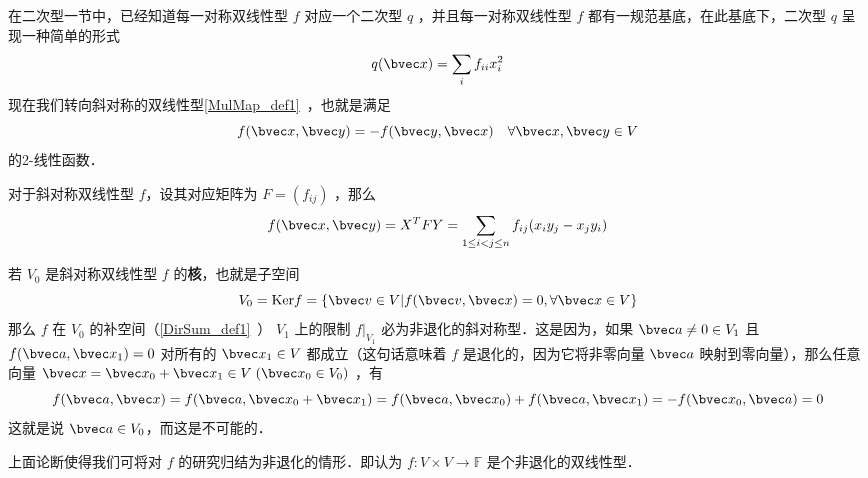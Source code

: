 
在二次型一节中，已经知道每一对称双线性型 $f$ 对应一个二次型 $q$ ，并且每一对称双线性型 $f$ 都有一规范基底，在此基底下，二次型 $q$ 呈现一种简单的形式
\begin{equation}
q(\bvec x)=\sum_{i}f_{ii}x_i^2
\end{equation}
现在我们转向斜对称的双线性型\autoref{MulMap_def1}~，也就是满足 
\begin{equation}
f(\bvec x,\bvec y)=-f(\bvec y,\bvec x)\quad \forall \bvec x,\bvec y\in V
\end{equation}
的2-线性函数．

对于斜对称双线性型 $f$，设其对应矩阵为 $F=(f_{ij})$ ，那么
\begin{equation}
f(\bvec x,\bvec y)=X^{T}FY=\sum_{1\leq i<j\leq n}f_{ij}(x_iy_j-x_jy_i)
\end{equation}

若 $V_0$ 是斜对称双线性型 $f$ 的\textbf{核}，也就是子空间
\begin{equation}
V_0=\mathrm{Ker} f=\{\bvec v\in V|f(\bvec v,\bvec x)=0,\forall\bvec x\in V\}
\end{equation}
那么 $f$ 在 $V_0$ 的补空间（\autoref{DirSum_def1}~） $V_1$ 上的限制 $f|_{V_1}$ 必为非退化的斜对称型．这是因为，如果 $\bvec a\neq0\in V_1$ 且 $f(\bvec a,\bvec x_1)=0$ 对所有的 $\bvec x_1\in V$ 都成立（这句话意味着 $f$ 是退化的，因为它将非零向量 $\bvec a$ 映射到零向量），那么任意向量 $\bvec x=\bvec x_0+\bvec x_1\in V \;(\bvec x_0\in V_0)$ ，有
\begin{equation}
f(\bvec a,\bvec x)=f(\bvec a,\bvec x_0+\bvec x_1)=f(\bvec a,\bvec x_0)+f(\bvec a,\bvec x_1)=-f(\bvec x_0,\bvec a)=0
\end{equation}
 这就是说 $\bvec a\in V_0$，而这是不可能的．

 上面论断使得我们可将对 $f$ 的研究归结为非退化的情形．即认为 $f:V\times V\rightarrow\mathbb{F}$ 是个非退化的双线性型．
